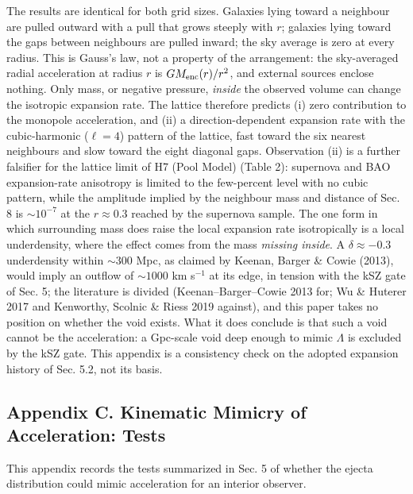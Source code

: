 \documentclass[
]{article}
\begin{document}
The results are identical for both grid sizes. Galaxies lying toward a
neighbour are pulled outward with a pull that grows steeply with \(r\);
galaxies lying toward the gaps between neighbours are pulled inward; the
sky average is zero at every radius. This is Gauss's law, not a property
of the arrangement: the sky-averaged radial acceleration at radius \(r\)
is \(G M_{\rm enc}(r)/r^2\), and external sources enclose nothing. Only
mass, or negative pressure, \emph{inside} the observed volume can change
the isotropic expansion rate. The lattice therefore predicts (i) zero
contribution to the monopole acceleration, and (ii) a
direction-dependent expansion rate with the cubic-harmonic
(\(\ell = 4\)) pattern of the lattice, fast toward the six nearest
neighbours and slow toward the eight diagonal gaps. Observation (ii) is
a further falsifier for the lattice limit of H7 (Pool Model) (Table 2):
supernova and BAO expansion-rate anisotropy is limited to the
few-percent level with no cubic pattern, while the amplitude implied by
the neighbour mass and distance of Sec. 8 is \(\sim\!10^{-7}\) at the
\(r \approx 0.3\) reached by the supernova sample. The one form in which
surrounding mass does raise the local expansion rate isotropically is a
local underdensity, where the effect comes from the mass \emph{missing
inside}. A \(\delta \approx -0.3\) underdensity within \(\sim\!300\)
Mpc, as claimed by Keenan, Barger \& Cowie (2013), would imply an
outflow of \(\sim\!1000\) km s\(^{-1}\) at its edge, in tension with the
kSZ gate of Sec. 5; the literature is divided (Keenan--Barger--Cowie
2013 for; Wu \& Huterer 2017 and Kenworthy, Scolnic \& Riess 2019
against), and this paper takes no position on whether the void exists.
What it does conclude is that such a void cannot be the acceleration: a
Gpc-scale void deep enough to mimic \(\Lambda\) is excluded by the kSZ
gate. This appendix is a consistency check on the adopted expansion
history of Sec. 5.2, not its basis.

\hypertarget{appendix-c.-kinematic-mimicry-of-acceleration-tests}{%
\subsection{\texorpdfstring{\textbf{Appendix C. Kinematic Mimicry of
Acceleration:
Tests}}{Appendix C. Kinematic Mimicry of Acceleration: Tests}}\label{appendix-c.-kinematic-mimicry-of-acceleration-tests}}

This appendix records the tests summarized in Sec. 5 of whether the
ejecta distribution could mimic acceleration for an interior observer.
\end{document}
